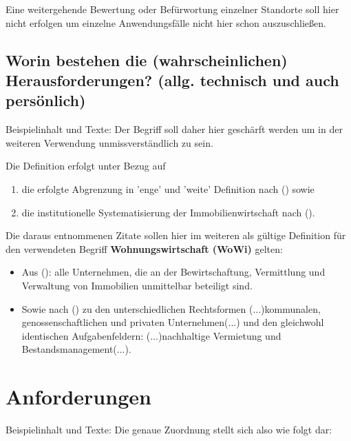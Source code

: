 \documentclass[12pt,oneside,titlepage]{scrartcl}
\begin{document}
Eine weitergehende Bewertung oder Befürwortung einzelner Standorte soll hier nicht erfolgen um einzelne Anwendungsfälle nicht hier schon auszuschließen.


\subsection{Worin bestehen die (wahrscheinlichen) Herausforderungen? (allg. technisch und auch persönlich)}
Beispielinhalt und Texte:
Der Begriff soll daher hier geschärft werden um in der weiteren Verwendung un­miss­ver­ständ­lich zu sein.  

Die Definition erfolgt unter Bezug auf
\begin{enumerate}
	\item  die erfolgte Abgrenzung in 'enge' und 'weite' Definition nach \citeauthor{wirtschaftsfaktorimmo} (\citeyear[S. 9]{wirtschaftsfaktorimmo}) sowie
	\item die institutionelle Systematisierung der Immobilienwirtschaft nach \citeauthor{brauer2011einfuhrung} (\citeyear[S. 26]{brauer2011einfuhrung}).
\end{enumerate}

Die daraus entnommenen Zitate sollen hier im weiteren als gültige Definition für den verwendeten Begriff \textbf{Wohnungswirtschaft (WoWi)} gelten:  
\begin{itemize}
	\item Aus \citeauthor{wirtschaftsfaktorimmo} (\citeyear[S. 9]{wirtschaftsfaktorimmo}): \glqq{}alle Unternehmen, die an der Bewirtschaftung, Vermittlung und Verwaltung von Immobilien unmittelbar beteiligt sind\grqq{}. 
	 \item Sowie nach \citeauthor{brauer2011einfuhrung} (\citeyear[S. 36]{brauer2011einfuhrung}) zu den unterschiedlichen Rechtsformen \glqq{}(...)kommunalen, genossenschaftlichen und privaten Unternehmen(...)\grqq{} und den gleichwohl identischen Aufgabenfeldern: \glqq{}(...)nachhaltige Vermietung und Bestandsmanagement(...)\grqq{}.
\end{itemize}





\newpage
\section{Anforderungen}
Beispielinhalt und Texte:
Die genaue Zuordnung stellt sich also wie folgt dar:
\end{document}
